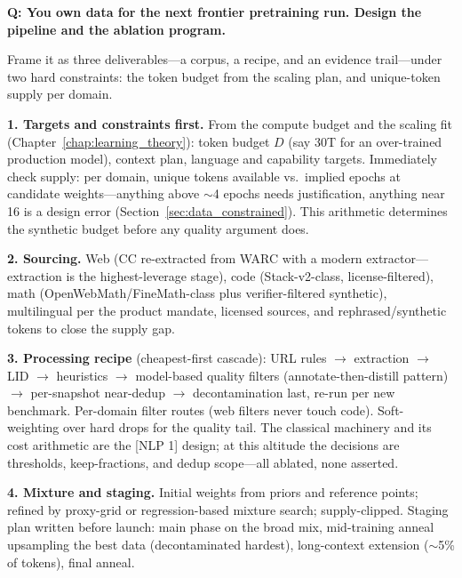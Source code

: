 \medskip

\begin{interviewq}
\textbf{Q: You own data for the next frontier pretraining run. Design the pipeline and the ablation program.}

 \quad {} \quad \badgefreq{\freqhigh}

\stronganswer
Frame it as three deliverables---a corpus, a recipe, and an evidence trail---under two hard constraints: the token budget from the scaling plan, and unique-token supply per domain.

\textbf{1. Targets and constraints first.} From the compute budget and the scaling fit (Chapter~\ref{chap:learning_theory}): token budget $D$ (say 30T for an over-trained production model), context plan, language and capability targets. Immediately check supply: per domain, unique tokens available vs.\ implied epochs at candidate weights---anything above $\sim$4 epochs needs justification, anything near 16 is a design error (Section~\ref{sec:data_constrained}). This arithmetic determines the synthetic budget before any quality argument does.

\textbf{2. Sourcing.} Web (CC re-extracted from WARC with a modern extractor---extraction is the highest-leverage stage), code (Stack-v2-class, license-filtered), math (OpenWebMath/FineMath-class plus verifier-filtered synthetic), multilingual per the product mandate, licensed sources, and rephrased/synthetic tokens to close the supply gap.

\textbf{3. Processing recipe} (cheapest-first cascade): URL rules $\rightarrow$ extraction $\rightarrow$ LID $\rightarrow$ heuristics $\rightarrow$ model-based quality filters (annotate-then-distill pattern) $\rightarrow$ per-snapshot near-dedup $\rightarrow$ decontamination last, re-run per new benchmark. Per-domain filter routes (web filters never touch code). Soft-weighting over hard drops for the quality tail. The classical machinery and its cost arithmetic are the [NLP 1] design; at this altitude the decisions are thresholds, keep-fractions, and dedup scope---all ablated, none asserted.

\textbf{4. Mixture and staging.} Initial weights from priors and reference points; refined by proxy-grid or regression-based mixture search; supply-clipped. Staging plan written before launch: main phase on the broad mix, mid-training anneal upsampling the best data (decontaminated hardest), long-context extension ($\sim$5\% of tokens), final anneal.


\end{interviewq}
